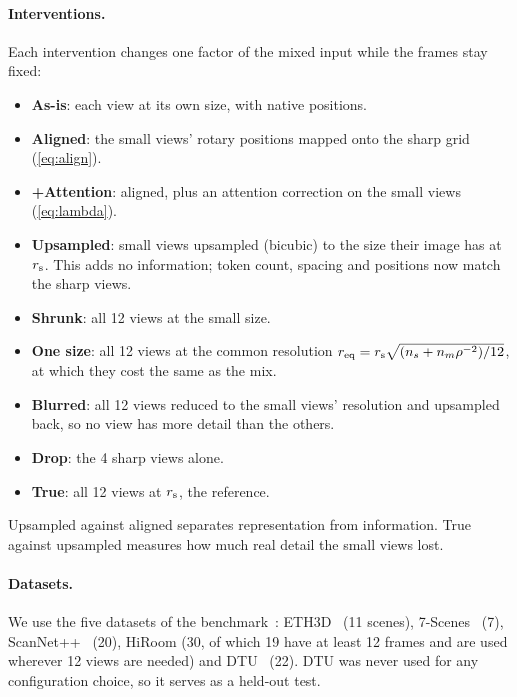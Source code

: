 \paragraph{Interventions.}
Each intervention changes one factor of the mixed input while the frames stay fixed:
\begin{itemize}[nosep,leftmargin=*]
  \item \textbf{As-is}: each view at its own size, with native positions.
  \item \textbf{Aligned}: the small views' rotary positions mapped onto the sharp grid (\cref{eq:align}).
  \item \textbf{+Attention}: aligned, plus an attention correction on the small views (\cref{eq:lambda}).
  \item \textbf{Upsampled}: small views upsampled (bicubic) to the size their image has at $r_{\mathrm{s}}$. This adds no information; token count, spacing and positions now match the sharp views.
  \item \textbf{Shrunk}: all 12 views at the small size.
  \item \textbf{One size}: all 12 views at the common resolution $r_{\mathrm{eq}}=r_{\mathrm{s}}\sqrt{(n_s+n_m\rho^{-2})/12}$, at which they cost the same as the mix.
  \item \textbf{Blurred}: all 12 views reduced to the small views' resolution and upsampled back, so no view has more detail than the others.
  \item \textbf{Drop}: the 4 sharp views alone.
  \item \textbf{True}: all 12 views at $r_{\mathrm{s}}$, the reference.
\end{itemize}
Upsampled against aligned separates representation from information. True against upsampled measures how much real detail the small views lost.

\paragraph{Datasets.}
We use the five datasets of the \dathree benchmark~\cite{lin2025da3}: ETH3D~\cite{schops2017eth3d} (11 scenes), 7-Scenes~\cite{shotton2013scene} (7), ScanNet++~\cite{yeshwanth2023scannetpp} (20), HiRoom (30, of which 19 have at least 12 frames and are used wherever 12 views are needed) and DTU~\cite{jensen2014large} (22). DTU was never used for any configuration choice, so it serves as a held-out test.

